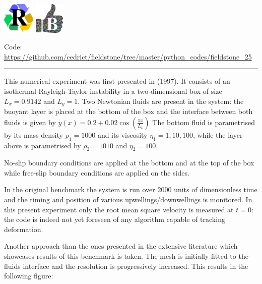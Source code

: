 
\includegraphics[height=1.5cm]{images/pictograms/replication}
\includegraphics[height=1.5cm]{images/pictograms/benchmark}



\begin{center}
\inpython
{\small Code: \url{https://github.com/cedrict/fieldstone/tree/master/python_codes/fieldstone_25}}
\end{center}

\par\noindent\rule{\textwidth}{0.4pt}

This numerical experiment was first presented in \textcite{vaks97} (1997).
It consists of an isothermal Rayleigh-Taylor instability in a two-dimensional box
of size $L_x=0.9142$ and $L_y=1$.
Two Newtonian fluids are present in the system: the buoyant layer is placed at the bottom of 
the box and the interface between both fluids is given by 
$
y(x)=0.2+0.02\cos \left( \frac{\pi x}{L_x}  \right)
$
The bottom fluid is parametrised by its mass density $\rho_1=1000$ and its viscosity $\eta_1=1,10,100$, 
while the layer above is parametrised by $\rho_2=1010$ and $\eta_2=100$.

No-slip boundary conditions are applied at the bottom and at the top of the box 
while free-slip boundary conditions are applied on the sides. 

In the original benchmark the system is run over 2000 units of dimensionless time and the 
timing and position of various upwellings/downwellings is monitored. 
In this present experiment only the root mean square velocity is measured at $t=0$:
the code is indeed not yet foreseen of any algorithm capable of tracking deformation.

Another approach than the ones presented in the extensive literature which showcases 
results of this benchmark is taken. The mesh is initially fitted to the fluids
interface and the resolution is progressively increased. This results in the 
following figure:

